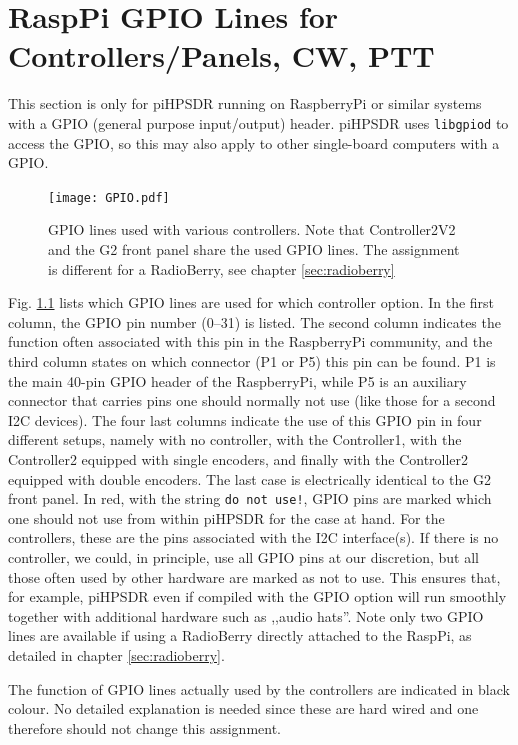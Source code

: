 \documentclass[12pt]{book}
\def\pH{pi\-HPSDR\xspace}
\begin{document}
\chapter[RaspPi GPIO lines]{RaspPi GPIO Lines for Controllers/Panels, CW, PTT}
\label{sec:gpio}
This section is only for \pH running on RaspberryPi or similar systems with a GPIO (general purpose
input/output) header. \pH uses \texttt{libgpiod} to access the GPIO, so this may also apply to
other single-board computers with a GPIO.

\begin{figure}[ht!]
\center
\texttt{[image: GPIO.pdf]}
\caption{GPIO lines used with various controllers. Note that Controller2V2 and the G2 front panel
share the used GPIO lines. The assignment is different for a RadioBerry, see chapter \ref{sec:radioberry}}
\label{fig:GPIO}
\end{figure}

Fig. \ref{fig:GPIO} lists which GPIO lines are used for which controller option. In the first column,
the GPIO pin number (0--31) is listed. The second column indicates the function often
associated with this pin in the RaspberryPi community, and the third column states on which connector
(P1 or P5) this pin can be found. P1 is the main 40-pin GPIO header of the RaspberryPi, while P5 is
an auxiliary connector that carries pins one should normally not use (like those for a second I2C
devices). The four last columns indicate the use of this GPIO pin in four different setups, namely
with no controller, with the Controller1, with the Controller2 equipped with single encoders, and
finally with the Controller2 equipped with double encoders. The last case is electrically identical to
the G2 front panel. In red, with the string \texttt{do not use!}, GPIO pins are marked which one should
not use from within \pH for the case at hand. For the controllers, these are the pins associated
with the I2C interface(s). If there is no controller, we could, in principle, use all GPIO pins at our
discretion, but all those often used by other hardware are marked as not to use. This ensures that,
for example, \pH even if compiled with the GPIO option will run smoothly together with additional
hardware such as ,,audio hats''. Note only two GPIO lines are available if using a RadioBerry
directly attached to the RaspPi, as detailed in chapter \ref{sec:radioberry}.

The function of GPIO lines actually used by the controllers are indicated in black colour. No detailed
explanation is needed since these are hard wired and one therefore should not change this assignment.
\end{document}
